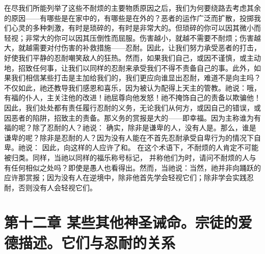 在尽我们所能列举了这些不耐烦的主要物质原因之后，我们为何要绕路去考虑其余的原因——有哪些是在家中的，有哪些是在外的？恶者的运作广泛而扩散，投掷我们心灵的多种刺激，有时是琐碎的，有时是非常大的。但琐碎的你可以因其微小而轻视；非常大的你可以因其压倒性而屈服。伤害越小，就越不需要不耐烦；伤害越大，就越需要对付伤害的补救措施——忍耐。因此，让我们努力承受恶者的打击，好使我们平静的忍耐嘲笑敌人的狂热。然而，如果我们自己，或因不谨慎，或主动地，招致任何事，让我们以同样的忍耐来承受我们不得不责备自己的事。此外，如果我们相信某些打击是主加给我们的，我们更应向谁显出忍耐，难道不是向主吗？不仅如此，祂还教导我们感恩和喜乐，因为被认为配得上天主的管教。祂说：哦，有福的仆人，主关注他的改进！祂屈尊向他发怒！祂不掩饰自己的责备以欺骗他！因此，我们处处都有责任履行忍耐的义务，无论我们从何方，或因自己的错误，或因恶者的陷阱，招致主的责备。那义务的赏报是大的——即幸福。因为主称谁为有福的呢？除了忍耐的人？祂说： 确实，除非是谦卑的人，没有人是。那么，谁是谦卑的呢？除非是忍耐的人？因为没有人能在不首先忍耐承受自卑行为的情况下自卑。祂说： 因此，向这样的人应许了和。 在这个术语下，不耐烦的人肯定不可能被归类。同样，当祂以同样的福乐称号标记， 并称他们为时，请问不耐烦的人与有任何相似之处吗？即使是愚人也看得出。然而，当祂说：当然，祂并非向踊跃的应许那赏报；因为没有人在逆境中，除非他首先学会轻视它们；除非学会实践忍耐，否则没有人会轻视它们。\par


\section{第十二章 某些其他神圣诫命。宗徒的爱德描述。它们与忍耐的关系}

